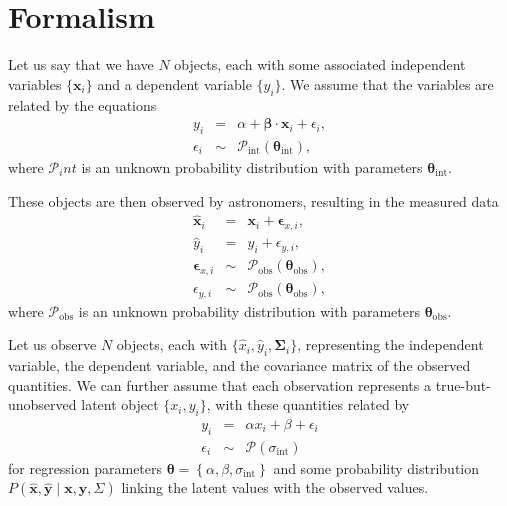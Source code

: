\documentclass[fleqn,usenatbib]{mnras}
\begin{document}
\section{Formalism}
\label{sec:formalism}

Let us say that we have $N$ objects, each with some associated independent
variables $\{\boldsymbol{x}_i\}$ and a dependent variable $\{y_i\}$. We assume
that the variables are related by the equations
\begin{align}
    y_i &=& \alpha + \boldsymbol{\beta} \cdot \boldsymbol{x}_i + \epsilon_i, \\
    \epsilon_i &\sim& \mathcal{P}_{\text{int}} \left( \boldsymbol{\theta}_{\text{int}} \right),
\end{align}
where $\mathcal{P}_int$ is an unknown probability distribution with parameters
$\boldsymbol{\theta}_{\text{int}}$.

These objects are then observed by astronomers, resulting in the measured
data
\begin{align}
    \hat{\boldsymbol{x}}_i &=& \boldsymbol{x}_i + \boldsymbol{\epsilon}_{x,i}, \\
    \hat{y}_i &=& y_i + \epsilon_{y,i}, \\
    \boldsymbol{\epsilon}_{x,i} &\sim& \mathcal{P}_{\text{obs}} \left( \boldsymbol{\theta}_{\text{obs}} \right), \\
    \epsilon_{y,i} &\sim& \mathcal{P}_{\text{obs}} \left( \boldsymbol{\theta}_{\text{obs}} \right),
\end{align}
where $\mathcal{P}_{\text{obs}}$ is an unknown probability distribution with
parameters $\boldsymbol{\theta}_{\text{obs}}$.

Let us observe $N$ objects, each with $\{\hat{x}_i, \hat{y}_i,
\boldsymbol{\Sigma}_i\}$, representing the independent variable, the dependent
variable, and the covariance matrix of the observed quantities.  We can further
assume that each observation represents a true-but-unobserved latent object
$\{x_i, y_i\}$, with these quantities related by
\begin{eqnarray}
    y_i &=& \alpha x_i + \beta + \epsilon_i \\
    \epsilon_i &\sim& \mathcal{P} \left( \sigma_{\text{int}} \right)
\end{eqnarray}
for regression parameters $\boldsymbol{\theta} = \left\{\alpha, \beta,
\sigma_{\mathrm{int}}\right\}$ and some probability distribution $P\left(
\hat{\mathbf{x}}, \hat{\mathbf{y}} \mid \mathbf{x}, \mathbf{y}, \Sigma \right)$
linking the latent values with the observed values.
\end{document}
